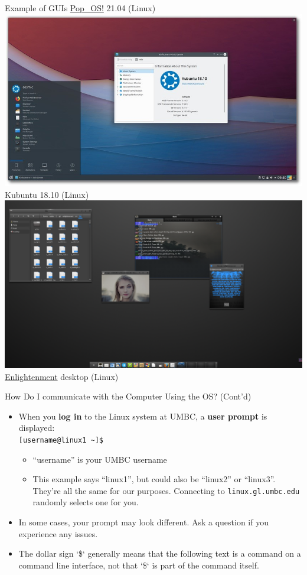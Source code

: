 \documentclass[graphics]{beamer}
\begin{document}
\begin{frame}{Example of GUIs}
{        \footnotesize{\href{https://pop.system76.com/}{Pop\_OS!} 21.04 (Linux)}
    }
     {
        \includegraphics[scale=0.43]{L03_OperatingSystems/L3_kubuntu.jpg}
        \footnotesize{Kubuntu 18.10 (Linux)}
    }
     {
        \includegraphics[scale=0.181]{L03_OperatingSystems/L3_enlightenment.png}
        \footnotesize{\href{https://www.enlightenment.org/}{Enlightenment} desktop (Linux)}
    }
\end{frame}

\begin{frame}{How Do I communicate with the Computer Using the OS? (Cont'd)}
    \begin{itemize}
        \item When you \textbf{log in} to the Linux system at UMBC, a \textbf{user prompt} is displayed: \\ \texttt{[username@linux1 \textasciitilde]\$}
        \begin{itemize}
            \item ``username'' is your UMBC username
            \item This example says ``linux1'', but could also be ``linux2'' or ``linux3''. They're all the same for our purposes. Connecting to \texttt{linux.gl.umbc.edu} randomly selects one for you.
        \end{itemize}
        \item In some cases, your prompt may look different. Ask a question if you experience any issues.
        \item The dollar sign `\$` generally means that the following text is a command on a command line interface, not that `\$` is part of the command itself.
    \end{itemize}
\end{frame}
\end{document}
